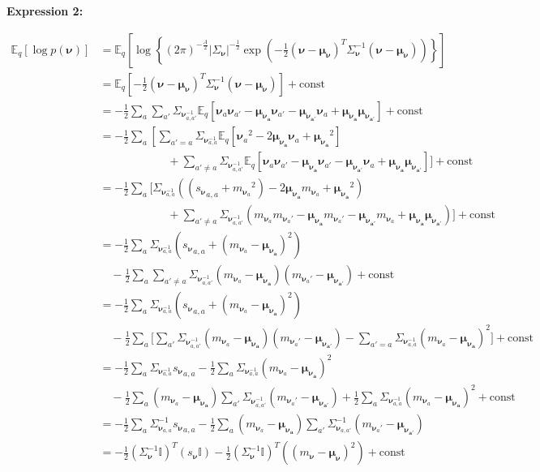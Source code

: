 \documentclass[letterpaper,12pt]{article}
\newcommand{\lc}{\left \{} %
\newcommand{\rc}{\right \}} %
\newcommand{\lp}{\left (} %
\newcommand{\rp}{\right )} %
\newcommand{\lb}{\left [} %
\newcommand{\rb}{\right ]} %
\newcommand{\mean}[1]{\ensuremath{\boldsymbol{\mu}_{#1}}} %
\newcommand{\nuv}{\boldsymbol{\nu}} %
\newcommand{\Sigmanu}{\Sigma_{\nuv}} %
\newcommand{\snu}{\ensuremath{s_\nuv}} %
\newcommand{\nua}{\ensuremath{\nuv_a}} %
\newcommand{\nuaprime}{\ensuremath{\nuv_{a'}}} %
\newcommand{\meananu}{\ensuremath{\boldsymbol{\mu_{\nuv_a}}}} %
\newcommand{\meanaprimenu}{\ensuremath{\boldsymbol{\mu_{\nuv_{a'}}}}} %
\newcommand{\mnusub}[1]{\ensuremath{m_{\nuv_#1}}} %
\newcommand{\E}{\mathbb{E}_q}
\begin{document}
\textbf{Expression 2:}

\begin{equation}
\begin{split}
    \E \lb \log p(\nuv) \rb &= \E \lb \log \lc (2 \pi)^{-\frac{A}{2}}|\Sigmanu |^{-\frac{1}{2}} \exp \lp - \frac{1}{2} (\nuv - \mean{\nuv})^T \Sigmanu^{-1} (\nuv - \mean{\nuv}) \rp \rc \rb \\
    &= \E \lb - \frac{1}{2} (\nuv - \mean{\nuv})^T \Sigmanu^{-1} (\nuv - \mean{\nuv}) \rb + \textrm{const} \\
    &= - \frac{1}{2} \sum_a \sum_{a'}  \Sigmanu_{a,a'}^{-1} \E \lb \nua \nuaprime - \meananu \nuaprime - \meanaprimenu \nua + \meananu \meanaprimenu \rb + \textrm{const} \\
    &= - \frac{1}{2} \sum_a \lb \sum_{a'=a}  \Sigmanu_{a,a}^{-1} \E \lb \nua^2 - 2 \meananu \nua + \meananu^2 \rb \\
    & \qquad \qquad \qquad + \sum_{a' \neq a} \Sigmanu_{a,a'}^{-1} \E \lb  \nua \nuaprime - \meananu \nuaprime - \meanaprimenu \nua + \meananu \meanaprimenu \rb \Bigg] + \textrm{const} \\
    &= - \frac{1}{2} \sum_a \Bigg[  \Sigmanu_{a,a}^{-1} \lp \lp {\snu_{a,a}} + \mnusub{a}^2 \rp - 2 \meananu \mnusub{a} + \meananu^2 \rp \\
    & \qquad \qquad \qquad + \sum_{a' \neq a} \Sigmanu_{a,a'}^{-1} \lp \mnusub{a} \mnusub{a'} - \meananu \mnusub{a'} - \meanaprimenu \mnusub{a} + \meananu \meanaprimenu \rp \Bigg] + \textrm{const} \\
    &= - \frac{1}{2} \sum_a \Sigmanu_{a,a}^{-1} \lp {\snu_{a,a}} + \lp \mnusub{a} - \meananu \rp^2 \rp \\
    & \quad - \frac{1}{2} \sum_a \sum_{a' \neq a} \Sigmanu_{a,a'}^{-1} \lp  \mnusub{a}  - \meananu \rp \lp \mnusub{a'} - \meanaprimenu \rp  + \textrm{const} \\
    &= - \frac{1}{2} \sum_a \Sigmanu_{a,a}^{-1} \lp {\snu_{a,a}} + \lp \mnusub{a} - \meananu \rp^2 \rp \\
    & \quad - \frac{1}{2} \sum_a \bigg[ \sum_{a'} \Sigmanu_{a,a'}^{-1} \lp  \mnusub{a}  - \meananu \rp \lp \mnusub{a'} - \meanaprimenu \rp - \sum_{a'= a} \Sigmanu_{a,a}^{-1} \lp  \mnusub{a}  - \meananu \rp^2  \bigg]  + \textrm{const} \\
    &= - \frac{1}{2} \sum_a \Sigmanu_{a,a}^{-1} {\snu_{a,a}} - \frac{1}{2} \sum_a \Sigmanu_{a,a}^{-1} \lp \mnusub{a} - \meananu \rp^2 \\
    & \quad - \frac{1}{2} \sum_a \lp  \mnusub{a}  - \meananu \rp \sum_{a'} \Sigmanu_{a,a'}^{-1}  \lp \mnusub{a'} - \meanaprimenu \rp + \frac{1}{2} \sum_{a} \Sigmanu_{a,a}^{-1} \lp  \mnusub{a}  - \meananu \rp^2  + \textrm{const} \\
    & = - \frac{1}{2} \sum_a \Sigma_{\nuv_{a,a}}^{-1} {\snu_{a,a}} - \frac{1}{2} \sum_a \lp  \mnusub{a}  - \meananu \rp \sum_{a'} \Sigma_{\nuv_{a,a'}}^{-1}  \lp \mnusub{a'} - \meanaprimenu \rp \\
    &= - \frac{1}{2} (\Sigmanu^{-1} \mathbb{I} )^T (s_{\nuv} \mathbb{I}) - \frac{1}{2} (\Sigmanu^{-1} \mathbb{I} )^T \lp (m_{\nuv} - \boldsymbol{\mu}_{\nuv} )^2\rp + \textrm{const}
\end{split}
\end{equation}
\end{document}
